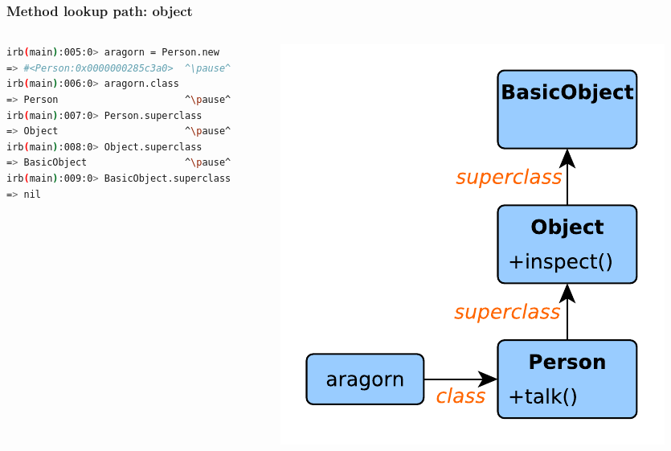 \begin{frame}[fragile]\frametitle{Method lookup path: object}

\begin{columns}[c] 

\begin{column}{7.4cm}
\begin{lstlisting}[language=bash, escapechar={^}]
irb(main):005:0> aragorn = Person.new
=> #<Person:0x0000000285c3a0>  ^\pause^
irb(main):006:0> aragorn.class
=> Person                      ^\pause^
irb(main):007:0> Person.superclass
=> Object                      ^\pause^
irb(main):008:0> Object.superclass
=> BasicObject                 ^\pause^
irb(main):009:0> BasicObject.superclass
=> nil
\end{lstlisting}
\end{column}
\pause

\begin{column}{3.9cm}
\includegraphics[scale=0.55]{diagrams/object_lookup_path.pdf}
\end{column}

\end{columns}

\end{frame}





